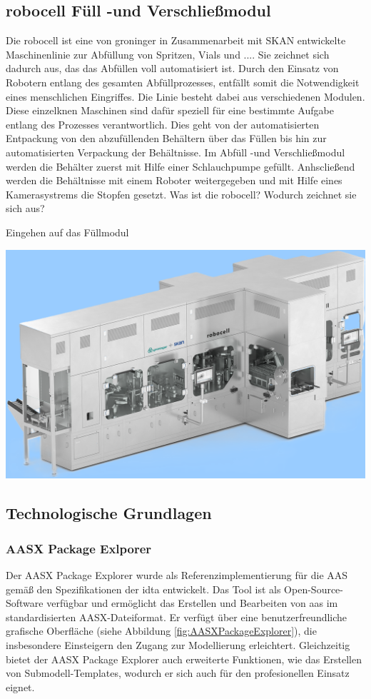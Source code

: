 %

\subsection{robocell Füll -und Verschließmodul}
Die robocell ist eine von groninger in Zusammenarbeit mit SKAN entwickelte Maschinenlinie zur Abfüllung von Spritzen, Vials und ....
Sie zeichnet sich dadurch aus, das das Abfüllen voll automatisiert ist. Durch den Einsatz von Robotern entlang des gesamten Abfüllprozesses, entfällt somit die Notwendigkeit eines menschlichen Eingriffes.
Die Linie besteht dabei aus verschiedenen Modulen.
Diese einzelknen Maschinen sind dafür speziell für eine bestimmte Aufgabe entlang des Prozesses verantwortlich.
Dies geht von der automatisierten Entpackung von den abzufüllenden Behältern über das Füllen bis hin zur automatisierten Verpackung der Behältnisse.
Im Abfüll -und Verschließmodul werden die Behälter zuerst mit Hilfe einer Schlauchpumpe gefüllt. Anhscließend werden die Behältnisse mit einem Roboter weitergegeben und mit Hilfe eines Kamerasystrems die Stopfen gesetzt.
Was ist die robocell? Wodurch zeichnet sie sich aus?

Eingehen auf das Füllmodul


\includegraphics{Bilder/robocell_FS2_rgb_Logo.png}
\subsection{Technologische Grundlagen}
\newpage
\subsubsection{AASX Package Exlporer}
Der AASX Package Explorer wurde als Referenzimplementierung für die AAS gemäß den Spezifikationen der \acs{idta} entwickelt.
Das Tool ist als Open-Source-Software \cite{AASXPackageExplorer} verfügbar und ermöglicht das Erstellen und Bearbeiten von \acs{aas} im standardisierten AASX-Dateiformat.
Er verfügt über eine benutzerfreundliche grafische Oberfläche (siehe Abbildung \ref{fig:AASXPackageExplorer}), die insbesondere Einsteigern den Zugang zur Modellierung erleichtert.
Gleichzeitig bietet der AASX Package Explorer auch erweiterte Funktionen, wie das Erstellen von Submodell-Templates, wodurch er sich auch für den profesionellen Einsatz eignet.

